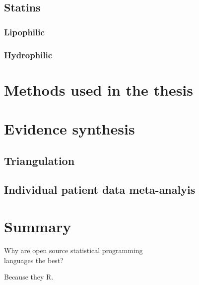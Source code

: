 \documentclass[a4paper, twoside]{templates/ociamthesis}
\begin{document}
\hypertarget{statins}{%
\subsection{Statins}\label{statins}}

\hypertarget{lipophilic}{%
\subsubsection{Lipophilic}\label{lipophilic}}

\hypertarget{hydrophilic}{%
\subsubsection{Hydrophilic}\label{hydrophilic}}

\hypertarget{methods-used-in-the-thesis}{%
\section{Methods used in the thesis}\label{methods-used-in-the-thesis}}

\hypertarget{evidence-synthesis}{%
\section{Evidence synthesis}\label{evidence-synthesis}}

\hypertarget{triangulation}{%
\subsection{Triangulation}\label{triangulation}}

\hypertarget{individual-patient-data-meta-analyis}{%
\subsection{Individual patient data meta-analyis}\label{individual-patient-data-meta-analyis}}

\hypertarget{summary-1}{%
\section{Summary}\label{summary-1}}

\begin{savequote}
Why are open source statistical programming\\
languages the best?

Because they R.
\end{savequote}
\end{document}

